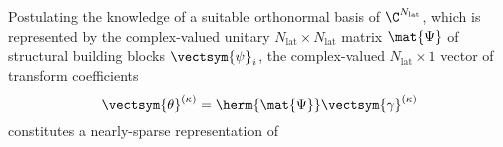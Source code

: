 Postulating
the knowledge of
a suitable orthonormal basis of
$\C^{ N_{\text{lat}} }$, which is represented by
the complex-valued unitary
$N_{\text{lat}} \times N_{\text{lat}}$ matrix
$\mat{\Psi}$ of
structural building blocks
$\vectsym{\psi}_{i}$,
the complex-valued
$N_{\text{lat}} \times 1$ vector of
transform coefficients
\begin{equation}
  \vectsym{\theta}^{(\kappa)}
  =
  \herm{ \mat{\Psi} }
  \vectsym{\gamma}^{(\kappa)}
 \label{eqn:recovery_reg_sparse_representation}
\end{equation}
constitutes
a nearly-sparse representation of

